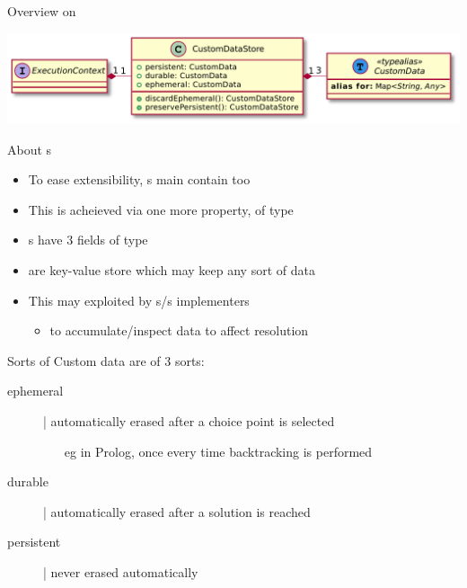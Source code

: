\documentclass[handout]{beamer}
\begin{document}
\begin{frame}[allowframebreaks]{Overview on }

    \begin{center}
        \includegraphics[width=.8\linewidth]{img/customdata.pdf}
    \end{center}

    \begin{block}{About s}
        \begin{itemize}
            \item To ease extensibility, s main contain  too
            \item This is acheieved via one more property, of type 
            \item {}s have 3 fields of type 
            \item {} are key-value store which may keep \alert{any sort} of data
            \item This may exploited by s/s implementers
            \begin{itemize}
                \item to accumulate/inspect data to affect resolution
            \end{itemize}
        \end{itemize}
    \end{block}

    \begin{block}{Sorts of }
        Custom data are of 3 sorts:
        \begin{description}
            \item[ephemeral] | automatically erased after a choice point is selected
            \begin{itemize}\small
                \item[eg] in Prolog, once every time \alert{backtracking} is performed
            \end{itemize}
            \item[durable] | automatically erased after a solution is reached
            \item[persistent] | never erased automatically
        \end{description}
    \end{block}
\end{frame}
\end{document}

